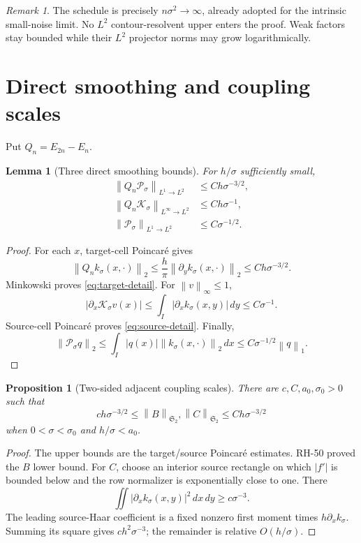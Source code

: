 \documentclass[11pt]{article}
\newtheorem{proposition}[theorem]{Proposition}
\newtheorem{lemma}[theorem]{Lemma}
\theoremstyle{remark}
\newtheorem{remark}[theorem]{Remark}
\newcommand{\cK}{\mathcal K}
\newcommand{\cP}{\mathcal P}
\newcommand{\HS}{\mathfrak S_2}
\newcommand{\norm}[1]{\left\lVert #1\right\rVert}
\begin{document}
\begin{remark}
The schedule is precisely \(n\sigma^2\to\infty\), already adopted for the
intrinsic small-noise limit.  No \(L^2\) contour-resolvent upper enters the
proof.  Weak factors stay bounded while their \(L^2\) projector norms may
grow logarithmically.
\end{remark}

\section{Direct smoothing and coupling scales}

Put \(Q_n=E_{2n}-E_n\).

\begin{lemma}[Three direct smoothing bounds]
\label{lem:smoothing}
For \(h/\sigma\) sufficiently small,
\begin{align}
 \norm{Q_n\cP_\sigma}_{L^1\to L^2}
 &\le C h\sigma^{-3/2},\label{eq:target-detail}\\
 \norm{Q_n\cK_\sigma}_{L^\infty\to L^2}
 &\le C h\sigma^{-1},\label{eq:source-detail}\\
 \norm{\cP_\sigma}_{L^1\to L^2}
 &\le C\sigma^{-1/2}.\label{eq:l1-l2}
\end{align}
\end{lemma}

\begin{proof}
For each \(x\), target-cell Poincar\'e gives
\[
 \norm{Q_n k_\sigma(x,\cdot)}_2
 \le\frac h\pi\norm{\partial_yk_\sigma(x,\cdot)}_2
 \le Ch\sigma^{-3/2}.
\]
Minkowski proves \eqref{eq:target-detail}.  For
\(\norm v_\infty\le1\),
\[
 |\partial_x\cK_\sigma v(x)|
 \le\int_I|\partial_xk_\sigma(x,y)|\,dy
 \le C\sigma^{-1}.
\]
Source-cell Poincar\'e proves \eqref{eq:source-detail}.  Finally,
\[
 \norm{\cP_\sigma q}_2
 \le\int_I|q(x)|\norm{k_\sigma(x,\cdot)}_2\,dx
 \le C\sigma^{-1/2}\norm q_1.
\]
\end{proof}

\begin{proposition}[Two-sided adjacent coupling scales]
\label{prop:couplings}
There are \(c,C,a_0,\sigma_0>0\) such that
\begin{equation}
 c h\sigma^{-3/2}
 \le\norm B_{\HS},\norm C_{\HS}
 \le C h\sigma^{-3/2}
 \label{eq:coupling-scales}
\end{equation}
when \(0<\sigma<\sigma_0\) and \(h/\sigma<a_0\).
\end{proposition}

\begin{proof}
The upper bounds are the target/source Poincar\'e estimates.  RH-50 proved
the \(B\) lower bound.  For \(C\), choose an interior source rectangle on
which \(|f'|\) is bounded below and the row normalizer is exponentially
close to one.  There
\[
 \iint|\partial_xk_\sigma(x,y)|^2\,dx\,dy\ge c\sigma^{-3}.
\]
The leading source-Haar coefficient is a fixed nonzero first moment times
\(h\partial_xk_\sigma\).  Summing its square gives
\(c h^2\sigma^{-3}\); the remainder is relative \(O(h/\sigma)\).
\end{proof}
\end{document}
